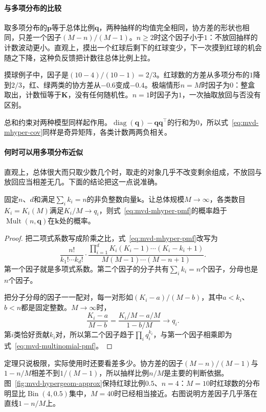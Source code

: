 \paragraph{与多项分布的比较}
取多项分布的$\bm{p}$等于总体比例$\bm{q}$，两种抽样的均值完全相同，协方差的形状也相同，只差一个因子$(M-n)/(M-1)$。$n\geq2$时这个因子小于$1$：不放回抽样的计数波动更小。直观上，摸出一个红球后剩下的红球变少，下一次摸到红球的机会随之下降，这种负反馈把计数往总体比例上拉。

摸球例子中，因子是$(10-4)/(10-1)=2/3$。红球数的方差从多项分布的$1$降到$2/3$，红、绿两类的协方差从$-0.6$变成$-0.4$。极端情形$n=M$时因子为$0$：整盒取出，计数恒等于$\bm{K}$，没有任何随机性。$n=1$时因子为$1$，一次抽取放回与否没有区别。

总和约束对两种模型同样起作用。$\operatorname{diag}(\bm{q})-\bm{q}\bm{q}^{\top}$的行和为$0$，所以式~\eqref{eq:mvd-mhyper-cov}同样是奇异矩阵，各类计数两两负相关。

\paragraph{何时可以用多项分布近似}
直观上，总体很大而只取少数几个时，取走的对象几乎不改变剩余组成，不放回与放回应当相差无几。下面的结论把这一点说准确。

\begin{theorem}[大总体下的多项近似]
\label{thm:mvd-mhyper-limit}
固定$n$、$d$和满足$\sum_ik_i=n$的非负整数向量$\bm{k}$。让总体规模$M\to\infty$，各类数目$K_i=K_i(M)$满足$K_i/M\to q_i$，则式~\eqref{eq:mvd-mhyper-pmf}的概率趋于$\operatorname{Mult}(n,\bm{q})$在$\bm{k}$处的概率。
\end{theorem}

\begin{proof}
把二项式系数写成阶乘之比，式~\eqref{eq:mvd-mhyper-pmf}改写为
\[
 \frac{n!}{k_1!\cdots k_d!}\cdot
 \frac{\prod_{i=1}^{d}K_i(K_i-1)\cdots(K_i-k_i+1)}{M(M-1)\cdots(M-n+1)} .
\]
第一个因子就是多项式系数。第二个因子的分子共有$\sum_ik_i=n$个因子，分母也是$n$个因子。

把分子分母的因子一一配对，每一对形如$(K_i-a)/(M-b)$，其中$a<k_i$、$b<n$都是固定整数。$M\to\infty$时，
\[
 \frac{K_i-a}{M-b}=\frac{K_i/M-a/M}{1-b/M}\to q_i .
\]
第$i$类恰好贡献$k_i$对，所以第二个因子趋于$\prod_iq_i^{k_i}$，与第一个因子相乘即为式~\eqref{eq:mvd-multinomial-pmf}。
\end{proof}

定理只说极限，实际使用时还要看差多少。协方差的因子$(M-n)/(M-1)$与$1-n/M$相差不到$1/(M-1)$，所以抽样比例$n/M$是主要的判断依据。图~\ref{fig:mvd-hypergeom-approx}保持红球比例$0.5$、$n=4$：$M=10$时红球数的分布明显比$\operatorname{Bin}(4,0.5)$集中，$M=40$时已经相当接近。右图说明方差因子几乎落在直线$1-n/M$上。


